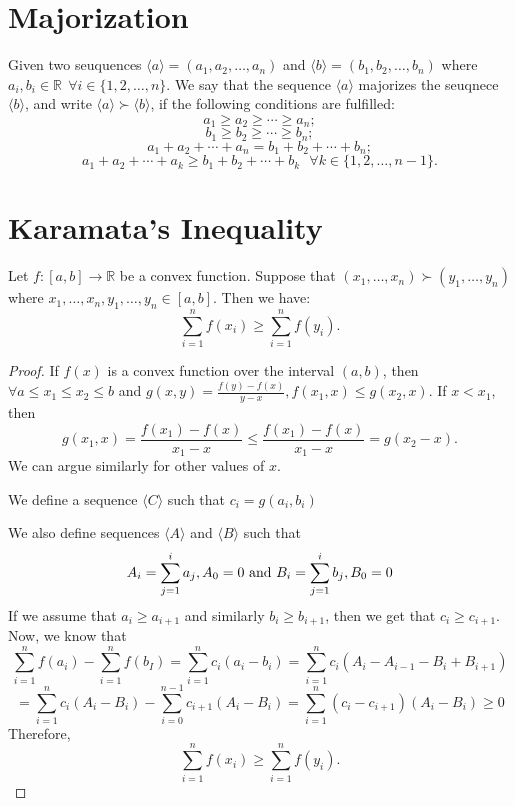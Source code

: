 \section{Majorization}
\begin{definition}[Majorization]
  Given two seuquences $\langle a\rangle = (a_1, a_2, \ldots, a_n)$ and $\langle b\rangle = (b_1, b_2, \ldots, b_n)$ where $a_i,
  b_i\in\mathbb{R}~~\forall i\in\{1,2,\ldots, n\}$. We say that the sequence $\langle a\rangle$ majorizes the seuqnece $\langle
  b\rangle$, and write $\langle a\rangle\succ \langle b\rangle$, if the following conditions are fulfilled:
  $$a_1\geq a_2\geq \cdots\geq a_n;$$
  $$b_1\geq b_2\geq \cdots\geq b_n;$$
  $$a_1 + a_2 + \cdots + a_n = b_1 + b_2 + \cdots + b_n;$$
  $$a_1 + a_2 + \cdots + a_k\geq b_1 + b_2 + \cdots + b_k~~~\forall k\in\{1, 2, \ldots, n - 1\}.$$
\end{definition}

\section{Karamata's Inequality}
\begin{theorem}
  Let $f: [a,b]\rightarrow\mathbb{R}$ be a convex function. Suppose that $(x_1, \ldots, x_n)\succ(y_1, \ldots, y_n)$ where $x_1,
  \ldots, x_n, y_1, \ldots, y_n\in[a, b]$. Then we have:
  \begin{equation}
    \sum_{i=1}^nf(x_i)\geq\sum_{i=1}^nf(y_i).
  \end{equation}
\end{theorem}

\begin{proof}
  If $f(x)$ is a convex function over the interval $(a, b)$, then $\forall a\leq x_1\leq x_2\leq b$ and $g(x, y)=\frac{f(y) -
    f(x)}{y - x}, f(x_1,x)\leq g(x_2, x)$. If $x<x_1$, then
  $$g(x_1, x) = \frac{f(x_1) - f(x)}{x_1 - x}\leq\frac{f(x_1) - f(x)}{x_1 - x} = g(x_2- x).$$
  We can argue similarly for other values of $x$.

  \noindent We define a sequence $\langle C\rangle$ such that $c_i = g(a_i, b_i)$

  \noindent We also define sequences $\langle A\rangle$ and $\langle B\rangle$ such that $$A_i = \sum_{j=1}^ia_j, A_0 =
  0\text{~{\rm{and}}~} B_i = \sum_{j=1}^ib_j, B_0 =0$$
  If we assume that $a_i\geq a_{i+1}$ and similarly $b_i\geq b_{i+1}$, then we get that $c_i\geq c_{i+1}$. Now, we know that
  $$\sum_{i=1}^nf(a_i) - \sum_{i=1}^nf(b_I) = \sum_{i=1}^nc_i(a_i - b_i) = \sum_{i=1}^nc_i(A_i - A_{i-1} - B_i + B_{i + 1})$$
  $$=\sum_{i=1}^nc_i(A_i - B_i) - \sum_{i=0}^{n-1}c_{i+1}(A_i - B_i) = \sum_{i=1}^n(c_i - c_{i+1})(A_i - B_i)\geq 0$$
  Therefore,
  $$\sum_{i=1}^nf(x_i)\geq\sum_{i=1}^nf(y_i).$$
\end{proof}

